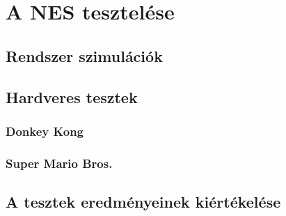 \chapter{A NES tesztelése}

\section{Rendszer szimulációk}

\section{Hardveres tesztek}

	\subsection{Donkey Kong}

	\subsection{Super Mario Bros.}

\section{A tesztek eredményeinek kiértékelése}